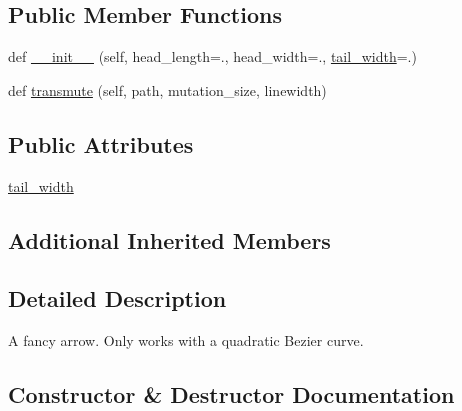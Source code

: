 \subsection*{Public Member Functions}
\begin{DoxyCompactItemize}
\item 
def \hyperlink{classmatplotlib_1_1patches_1_1ArrowStyle_1_1Fancy_ac571299330e32c10a6de5b82d08cb71b}{\+\_\+\+\_\+init\+\_\+\+\_\+} (self, head\+\_\+length=., head\+\_\+width=., \hyperlink{classmatplotlib_1_1patches_1_1ArrowStyle_1_1Fancy_abfed18076a9c8ad7ef9c2f0f83d0e755}{tail\+\_\+width}=.)
\item 
def \hyperlink{classmatplotlib_1_1patches_1_1ArrowStyle_1_1Fancy_a19631b638a21623f1e25d7b1ce7ee4ed}{transmute} (self, path, mutation\+\_\+size, linewidth)
\end{DoxyCompactItemize}
\subsection*{Public Attributes}
\begin{DoxyCompactItemize}
\item 
\hyperlink{classmatplotlib_1_1patches_1_1ArrowStyle_1_1Fancy_abfed18076a9c8ad7ef9c2f0f83d0e755}{tail\+\_\+width}
\end{DoxyCompactItemize}
\subsection*{Additional Inherited Members}


\subsection{Detailed Description}
\begin{DoxyVerb}A fancy arrow. Only works with a quadratic Bezier curve.\end{DoxyVerb}
 

\subsection{Constructor \& Destructor Documentation}
\mbox{\label{classmatplotlib_1_1patches_1_1ArrowStyle_1_1Fancy_ac571299330e32c10a6de5b82d08cb71b}} 
